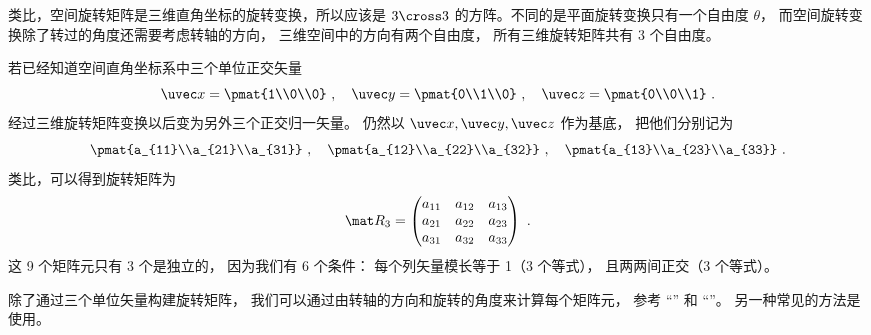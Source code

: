 
\begin{issues}
\issueDraft
\issueMissDepend
\end{issues}


类比，空间旋转矩阵是三维直角坐标的旋转变换，所以应该是 $3 \cross 3$ 的方阵。不同的是平面旋转变换只有一个自由度 $\theta $， 而空间旋转变换除了转过的角度还需要考虑转轴的方向， 三维空间中的方向有两个自由度， 所有三维旋转矩阵共有 3 个自由度。

若已经知道空间直角坐标系中三个单位正交矢量
\begin{equation}
\uvec x=\pmat{1\\0\\0}~, \quad
\uvec y=\pmat{0\\1\\0}~, \quad
\uvec z=\pmat{0\\0\\1}~.
\end{equation}
经过三维旋转矩阵变换以后变为另外三个正交归一矢量。 仍然以 $\uvec x, \uvec y, \uvec z$ 作为基底， 把他们分别记为
\begin{equation}\label{eq_Rot3D_1}
\pmat{a_{11}\\a_{21}\\a_{31}} ~,\quad \pmat{a_{12}\\a_{22}\\a_{32}} ~,\quad \pmat{a_{13}\\a_{23}\\a_{33}}~.
\end{equation}
类比，可以得到旋转矩阵为
\begin{equation}\label{eq_Rot3D_2}
\mat R_3 = \begin{pmatrix}
{a_{11}}&{a_{12}}&{a_{13}}\\
{a_{21}}&{a_{22}}&{a_{23}}\\
{a_{31}}&{a_{32}}&{a_{33}}
\end{pmatrix}~.\end{equation}
这 9 个矩阵元只有 3 个是独立的， 因为我们有 6 个条件： 每个列矢量模长等于 1（3 个等式）， 且两两间正交（3 个等式）。

除了通过三个单位矢量构建旋转矩阵， 我们可以通过由转轴的方向和旋转的角度来计算每个矩阵元， 参考 “” 和 “”。 另一种常见的方法是使用。

